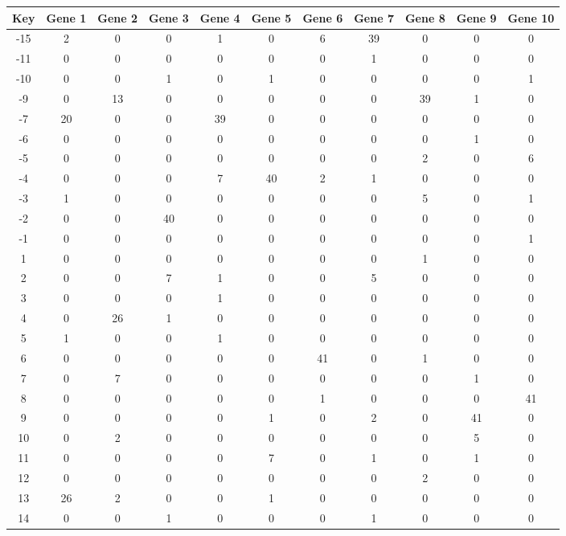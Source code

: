 \begin{tabular}{|c|c|c|c|c|c|c|c|c|c|c|}
\hline
Key & Gene 1 & Gene 2 & Gene 3 & Gene 4 & Gene 5 & Gene 6 & Gene 7 & Gene 8 & Gene 9 & Gene 10 \\
\hline
-15 & 2 & 0 & 0 & 1 & 0 & 6 & 39 & 0 & 0 & 0 \\
-11 & 0 & 0 & 0 & 0 & 0 & 0 & 1 & 0 & 0 & 0 \\
-10 & 0 & 0 & 1 & 0 & 1 & 0 & 0 & 0 & 0 & 1 \\
-9 & 0 & 13 & 0 & 0 & 0 & 0 & 0 & 39 & 1 & 0 \\
-7 & 20 & 0 & 0 & 39 & 0 & 0 & 0 & 0 & 0 & 0 \\
-6 & 0 & 0 & 0 & 0 & 0 & 0 & 0 & 0 & 1 & 0 \\
-5 & 0 & 0 & 0 & 0 & 0 & 0 & 0 & 2 & 0 & 6 \\
-4 & 0 & 0 & 0 & 7 & 40 & 2 & 1 & 0 & 0 & 0 \\
-3 & 1 & 0 & 0 & 0 & 0 & 0 & 0 & 5 & 0 & 1 \\
-2 & 0 & 0 & 40 & 0 & 0 & 0 & 0 & 0 & 0 & 0 \\
-1 & 0 & 0 & 0 & 0 & 0 & 0 & 0 & 0 & 0 & 1 \\
1 & 0 & 0 & 0 & 0 & 0 & 0 & 0 & 1 & 0 & 0 \\
2 & 0 & 0 & 7 & 1 & 0 & 0 & 5 & 0 & 0 & 0 \\
3 & 0 & 0 & 0 & 1 & 0 & 0 & 0 & 0 & 0 & 0 \\
4 & 0 & 26 & 1 & 0 & 0 & 0 & 0 & 0 & 0 & 0 \\
5 & 1 & 0 & 0 & 1 & 0 & 0 & 0 & 0 & 0 & 0 \\
6 & 0 & 0 & 0 & 0 & 0 & 41 & 0 & 1 & 0 & 0 \\
7 & 0 & 7 & 0 & 0 & 0 & 0 & 0 & 0 & 1 & 0 \\
8 & 0 & 0 & 0 & 0 & 0 & 1 & 0 & 0 & 0 & 41 \\
9 & 0 & 0 & 0 & 0 & 1 & 0 & 2 & 0 & 41 & 0 \\
10 & 0 & 2 & 0 & 0 & 0 & 0 & 0 & 0 & 5 & 0 \\
11 & 0 & 0 & 0 & 0 & 7 & 0 & 1 & 0 & 1 & 0 \\
12 & 0 & 0 & 0 & 0 & 0 & 0 & 0 & 2 & 0 & 0 \\
13 & 26 & 2 & 0 & 0 & 1 & 0 & 0 & 0 & 0 & 0 \\
14 & 0 & 0 & 1 & 0 & 0 & 0 & 1 & 0 & 0 & 0 \\
\hline
\end{tabular}